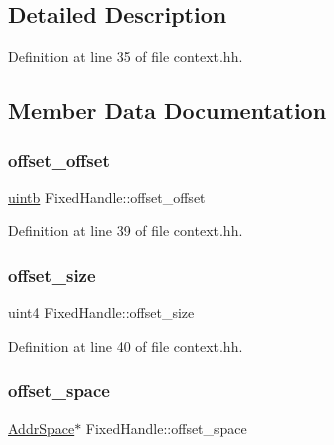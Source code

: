 \subsection{Detailed Description}


Definition at line 35 of file context.\+hh.



\subsection{Member Data Documentation}
\mbox{\label{struct_fixed_handle_a991cdc17d1977e3ad1c158441cfece03}} 
\subsubsection{\texorpdfstring{offset\_offset}{offset\_offset}}
{\footnotesize\ttfamily \mbox{\hyperlink{types_8h_a2db313c5d32a12b01d26ac9b3bca178f}{uintb}} Fixed\+Handle\+::offset\+\_\+offset}



Definition at line 39 of file context.\+hh.

\mbox{\label{struct_fixed_handle_a9dd13fb6e4c6658c00a4048c9e2c8951}} 
\subsubsection{\texorpdfstring{offset\_size}{offset\_size}}
{\footnotesize\ttfamily uint4 Fixed\+Handle\+::offset\+\_\+size}



Definition at line 40 of file context.\+hh.

\mbox{\label{struct_fixed_handle_a9c2922ee2c0bc37b8fbc2005120a01d9}} 
\subsubsection{\texorpdfstring{offset\_space}{offset\_space}}
{\footnotesize\ttfamily \mbox{\hyperlink{class_addr_space}{Addr\+Space}}$\ast$ Fixed\+Handle\+::offset\+\_\+space}



